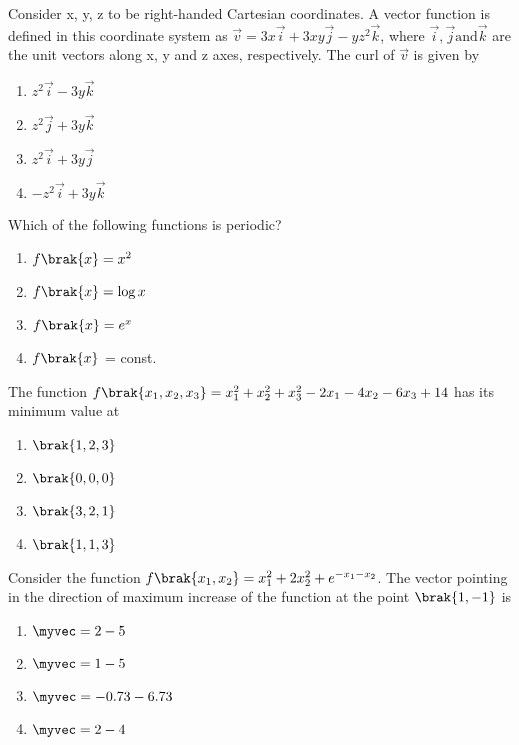 \iffalse
  \title{GateAssignment-2}
  \author{EE24BTECH11048-NITHIN.K} 
  \section{ae}
  \chapter{2011}
\fi

\item Consider x, y, z to be right-handed Cartesian coordinates. A vector function is defined in this coordinate system as $\vec{v} = 3x\vec{i} + 3xy\vec{j} - yz^2\vec{k}$, where $\vec{i}, \vec{j} \text{and} \vec{k}$ are the unit vectors along x, y and z axes, respectively. The curl of $\vec{v}$ is given by
	\begin{enumerate}
		\item $z^2\vec{i} - 3y\vec{k}$
		\item $z^2\vec{j} + 3y\vec{k}$
		\item $z^2\vec{i} + 3y\vec{j}$
		\item $-z^2\vec{i} + 3y\vec{k}$
	\end{enumerate}
\item Which of the following functions is periodic?
	\begin{enumerate}
		\item $f\brak{x} = x^2$
		\item $f\brak{x} = \log{x}$
		\item $f\brak{x} = e^x$ 
		\item $f\brak{x}$ = const.
	\end{enumerate}
\item The function $f\brak{x_1, x_2, x_3} = x_1^2 + x_2^2 + x_3^2 - 2x_1 - 4x_2 - 6x_3 + 14$ has its minimum value at
	\begin{enumerate} 
		\item $\brak{1,2,3}$
		\item $\brak{0,0,0}$
		\item $\brak{3,2,1}$       
		\item $\brak{1,1,3}$     
	\end{enumerate}
\item Consider the function $f\brak{x_1, x_2} = x_1^2 + 2x_2^2 + e^{-x_1 - x_2}$. The vector pointing in the direction of maximum increase of the function at the point $\brak{1, -1}$ is
	\begin{enumerate}
		\item $\myvec = {2 \\
			-5}$
		\item $\myvec = {1 \\
			-5}$
		\item $\myvec = {-0.73 \\
			-6.73}$
		\item $\myvec = {2 \\
			-4}$
	\end{enumerate}
